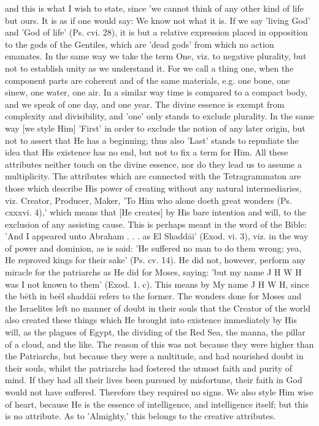 \documentclass[12pt]{article}
\begin{document}
and this is what I wish to state, since 'we cannot think of any other kind of life but ours. It is as if one would say: We know not what it is. If we say 'living God' and 'God of life' (Ps. cvi. 28), it is but a relative expression placed in opposition to the gods of the Gentiles, which are 'dead gods' from which no action emanates. In the same way we take the term One, viz. to negative plurality, but not to establish unity as we understand it. For we call a thing one, when the component parts are coherent and of the same materials, e.g. one bone, one sinew, one water, one air. In a similar way time is compared to a compact body, and we speak of one day, and one year. The divine essence is exempt from complexity and divisibility, and 'one' only stands to exclude plurality. In the same way [we style Him] 'First' in order to exclude the notion of any later origin, but not to assert that He has a beginning; thus also 'Last' stands to repudiate the idea that His existence has no end, but not to fix a term for Him. All these attributes neither touch on the divine essence, nor do they lead us to assume a multiplicity. The attributes which are connected with the Tetragrammaton are those which describe His power of creating without any natural intermediaries, viz. Creator, Producer, Maker, 'To Him who alone doeth great wonders (Ps. cxxxvi. 4),' which means that [He creates] by His bare intention and will, to the exclusion of any assisting cause. This is perhaps meant in the word of the Bible: 'And I appeared unto Abraham . . . as El Shaddāi' (Exod. vi. 3), viz. in the way of power and dominion, as is said: 'He suffered no man to do them wrong; yea, He reproved kings for their sake' (Ps. cv. 14). He did not, however, perform any miracle for the patriarchs as He did for Moses, saying: 'but my name J H W H was I not known to them' (Exod. 1. c). This means by My name J H W H, since the bēth in beēl shaddāi refers to the former. The wonders done for Moses and the Israelites left no manner of doubt in their souls that the Creator of the world also created these things which He brought into existence immediately by His will, as the plagues of Egypt, the dividing of the Red Sea, the manna, the pillar of a cloud, and the like. The reason of this was not because they were higher than the Patriarchs, but because they were a multitude, and had nourished doubt in their souls, whilst the patriarchs had fostered the utmost faith and purity of mind. If they had all their lives been pursued by misfortune, their faith in God would not have suffered. Therefore they required no signs. We also style Him wise of heart, because He is the essence of intelligence, and intelligence itself; but this is no attribute. As to 'Almighty,' this belongs to the creative attributes.
\end{document}
